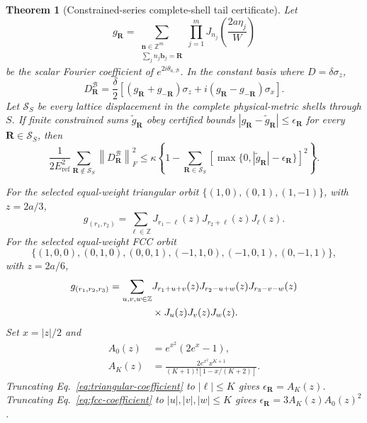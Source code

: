 \documentclass[11pt]{article}
\newcommand{\norm}[1]{\left\lVert #1\right\rVert}
\newtheorem{theorem}{Theorem}[section]
\begin{document}
\begin{theorem}[Constrained-series complete-shell tail certificate]
\label{thm:constrained-tail}
Let
\begin{equation}
 g_{\mathbf R}=
 \sum_{\substack{\mathbf n\in\mathbb Z^m\\
                   \sum_jn_j\mathbf b_j=\mathbf R}}
 \prod_{j=1}^mJ_{n_j}\!\left(\frac{2a\eta_j}{W}\right)
 \label{eq:constrained-coefficient}
\end{equation}
be the scalar Fourier coefficient of $e^{2i\theta_{a,\mathcal B}}$. In the constant
basis where $D=\delta\sigma_z$,
\begin{equation}
 D_{\mathbf R}^{\mathcal B}
 =\frac{\delta}{2}\left[
 (g_{\mathbf R}+g_{-\mathbf R})\sigma_z
 +i(g_{\mathbf R}-g_{-\mathbf R})\sigma_x
 \right].
 \label{eq:constrained-matrix-block}
\end{equation}
Let $\mathcal S_S$ be every lattice displacement in the complete physical-metric shells
through $S$. If finite constrained sums $\widetilde g_{\mathbf R}$ obey certified bounds
$|g_{\mathbf R}-\widetilde g_{\mathbf R}|\le\epsilon_{\mathbf R}$ for every
$\mathbf R\in\mathcal S_S$, then
\begin{equation}
 \frac{1}{2E_{\mathrm{ref}}^2}
 \sum_{\mathbf R\notin\mathcal S_S}
 \norm{D_{\mathbf R}^{\mathcal B}}_F^2
 \le\kappa\left\{
 1-\sum_{\mathbf R\in\mathcal S_S}
 \left[\max\{0,|\widetilde g_{\mathbf R}|-\epsilon_{\mathbf R}\}\right]^2
 \right\}.
 \label{eq:constrained-tail-certificate}
\end{equation}

For the selected equal-weight triangular orbit
$\{(1,0),(0,1),(1,-1)\}$, with $z=2a/3$,
\begin{equation}
 g_{(r_1,r_2)}=
 \sum_{\ell\in\mathbb Z}
 J_{r_1-\ell}(z)J_{r_2+\ell}(z)J_\ell(z).
 \label{eq:triangular-coefficient}
\end{equation}
For the selected equal-weight FCC orbit
\begin{equation}
 \{(1,0,0),(0,1,0),(0,0,1),(-1,1,0),(-1,0,1),(0,-1,1)\},
\end{equation}
with $z=2a/6$,
\begin{align}
 g_{(r_1,r_2,r_3)}
 =\sum_{u,v,w\in\mathbb Z}
 &J_{r_1+u+v}(z)J_{r_2-u+w}(z)J_{r_3-v-w}(z)\notag\\
 &\times J_u(z)J_v(z)J_w(z).
 \label{eq:fcc-coefficient}
\end{align}
Set $x=|z|/2$ and
\begin{align}
 A_0(z)&=e^{x^2}(2e^x-1),\\
 A_K(z)&=
 \frac{2e^{x^2}x^{K+1}}
 {(K+1)![1-x/(K+2)]}.
 \label{eq:absolute-bessel-tail}
\end{align}
Truncating Eq.~\eqref{eq:triangular-coefficient} to $|\ell|\le K$ gives
$\epsilon_{\mathbf R}=A_K(z)$. Truncating Eq.~\eqref{eq:fcc-coefficient} to
$|u|,|v|,|w|\le K$ gives
$\epsilon_{\mathbf R}=3A_K(z)A_0(z)^2$.
\end{theorem}
\end{document}
